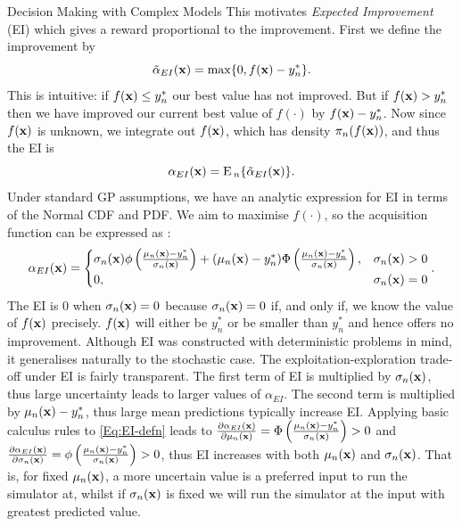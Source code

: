 \begin{chapter}{Decision Making with Complex Models \label{Chap:optimisation}}
This motivates \textit{Expected Improvement} (EI) which gives a reward proportional to the improvement. First we define the improvement by
\begin{equation}
 \tilde{\alpha}_{EI}(\mathbf{x}) = \max\{0, f(\mathbf{x})-y^{*}_n\}.
\end{equation}
This is intuitive: if $f(\mathbf{x}) \leq y^{*}_n$ our best value has not improved. But if $f(\mathbf{x}) > y^{*}_n$ then we have improved our current best value of $f(\cdot)$ by $f(\mathbf{x}) - y^{*}_n$. Now since $f(\mathbf{x})$ is unknown, we integrate out $f(\mathbf{x})$, which has density $\pi_n(f(\mathbf{x}))$, and thus the EI is
\begin{equation}
 \alpha_{EI}(\mathbf{x}) = \textrm{E}\,_n \{ \tilde{\alpha}_{EI}(\mathbf{x}) \}.
\end{equation}
Under standard GP assumptions, we have an analytic expression for EI in terms of the Normal CDF and PDF. We aim to maximise $f(\cdot)$, so the acquisition function can be expressed as \citep{Pourmohamad2021}:
\begin{equation}
 \alpha_{EI}(\mathbf{x}) = \begin{cases}
           \sigma_n(\mathbf{x})\phi\left(\frac{\mu_n(\mathbf{x})-y^{*}_n}{\sigma_n(\mathbf{x})}\right) + (\mu_n(\mathbf{x}) - y_n^{*})\Phi\left(\frac{\mu_n(\mathbf{x})-y^{*}_n}{\sigma_n(\mathbf{x})}\right),&  \sigma_n(\mathbf{x}) > 0 \\
           0, &  \sigma_n(\mathbf{x}) = 0
           \end{cases}. \label{Eq:EI-defn}
\end{equation}
The EI is $0$ when $\sigma_n(\mathbf{x}) = 0$ because $\sigma_n(\mathbf{x}) = 0$ if, and only if, we know the value of $f(\mathbf{x})$ precisely. $f(\mathbf{x})$ will either be $y_n^{*}$ or be smaller than $y_n^{*}$ and hence offers no improvement. Although EI was constructed with deterministic problems in mind, it generalises naturally to the stochastic case. The exploitation-exploration trade-off under EI is fairly transparent. The first term of EI is multiplied by $\sigma_n(\mathbf{x})$, thus large uncertainty leads to larger values of $\alpha_{EI}$. The second term is multiplied by $\mu_n(\mathbf{x}) - y_n^{*}$, thus large mean predictions typically increase EI. Applying basic calculus rules to \cref{Eq:EI-defn} leads to $\frac{\partial \alpha_{EI}(\mathbf{x})}{\partial \mu_n(\mathbf{x})} = \Phi \left( \frac{\mu_n(\mathbf{x}) - y^{*}_n}{\sigma_n(\mathbf{x})} \right) > 0$ and $\frac{\partial \alpha_{EI}(\mathbf{x})}{\partial \sigma_n(\mathbf{x})} = \phi \left( \frac{\mu_n(\mathbf{x}) - y^{*}_n}{\sigma_n(\mathbf{x})} \right) > 0$, thus EI increases with both $\mu_n(\mathbf{x})$ and $\sigma_n(\mathbf{x})$. That is, for fixed $\mu_n(\mathbf{x})$, a more uncertain value is a preferred input to run the simulator at, whilst if $\sigma_n(\mathbf{x})$ is fixed we will run the simulator at the input with greatest predicted value.


\end{chapter}

